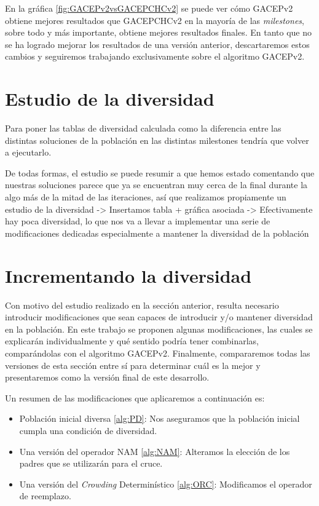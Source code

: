En la gráfica \ref{fig:GACEPv2vsGACEPCHCv2} se puede ver cómo GACEPv2 obtiene mejores resultados que GACEPCHCv2 en la mayoría de las \textit{milestones}, sobre todo y más importante, obtiene mejores resultados finales. 
En tanto que no se ha logrado mejorar los resultados de una versión anterior, descartaremos estos cambios y seguiremos trabajando exclusivamente sobre el algoritmo GACEPv2.

\section{Estudio de la diversidad}

\color{red}
Para poner las tablas de diversidad calculada como la diferencia entre las distintas soluciones de la población en las distintas milestones tendría que volver a ejecutarlo. 

De todas formas, el estudio se puede resumir a que hemos estado comentando que nuestras soluciones parece que ya se encuentran muy cerca de la final durante la algo más de la mitad de las iteraciones, así que realizamos propiamente un estudio de la diversidad -> Insertamos tabla + gráfica asociada -> Efectivamente hay poca diversidad, lo que nos va a llevar a implementar una serie de modificaciones dedicadas especialmente a mantener la diversidad de la población 
\color{black}

\section{Incrementando la diversidad}

Con motivo del estudio realizado en la sección anterior, resulta necesario introducir modificaciones que sean capaces de introducir y/o mantener diversidad en la población. 
En este trabajo se proponen algunas modificaciones, las cuales se explicarán individualmente y qué sentido podría tener combinarlas, comparándolas con el algoritmo GACEPv2. 
Finalmente, compararemos todas las versiones de esta sección entre sí para determinar cuál es la mejor y presentaremos como la versión final de este desarrollo. 

Un resumen de las modificaciones que aplicaremos a continuación es:
\begin{itemize}
	\item Población inicial diversa \ref{alg:PD}: Nos aseguramos que la población inicial cumpla una condición de diversidad. 
	\item Una versión del operador NAM \ref{alg:NAM}: Alteramos la elección de los padres que se utilizarán para el cruce.
	\item Una versión del \textit{Crowding} Determinístico \ref{alg:ORC}: Modificamos el operador de reemplazo.
\end{itemize}

